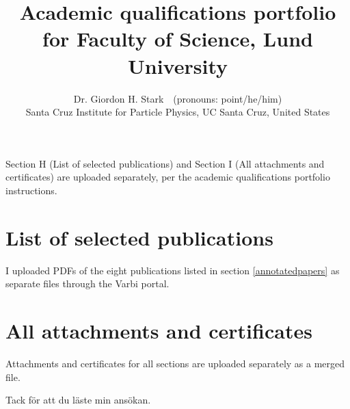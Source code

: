 \documentclass[10pt,a4paper,sans, oneside]{book}
\title{Academic qualifications portfolio for Faculty of Science, Lund University}
\author{Dr. Giordon H. Stark\ \faIcon{deaf}\ {\small\color{gray}(pronouns: point/he/him)}\\[1em]\faIcon{university} Santa Cruz Institute for Particle Physics, UC Santa Cruz, United States}
\date{}
\begin{document}
\maketitle

\tableofcontents

\vspace{1cm}
\noindent Section H (List of selected publications) and Section I (All attachments and certificates) are uploaded separately, per the academic qualifications portfolio instructions.















\vspace{2cm}

\section{List of selected publications} \label{sec:list-of-selected-publications}
I uploaded PDFs of the eight publications listed in section \ref{annotatedpapers} as separate files through the Varbi portal.

\section{All attachments and certificates} \label{sec:all-attachments-and-certificates}
Attachments and certificates for all sections are uploaded separately as a merged file.

\vspace{0.5cm}
\noindent Tack f\"or att du l\"aste min ans\"okan.
\end{document}
